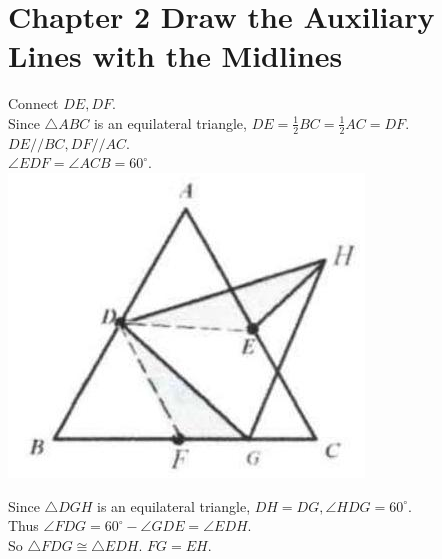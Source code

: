 \documentclass[10pt]{article}
\begin{document}
\section*{Chapter 2 Draw the Auxiliary Lines with the Midlines}
Connect \(D E, D F\).\\
Since \(\triangle A B C\) is an equilateral triangle, \(D E=\frac{1}{2} B C=\frac{1}{2} A C=D F\).\\
\(D E / / B C, D F / / A C\).\\
\(\angle E D F=\angle A C B=60^{\circ}\).\\
\includegraphics[max width=\textwidth, center]{2025_04_17_97bc1f7e44d93c271a88g-051(2)}

Since \(\triangle D G H\) is an equilateral triangle, \(D H=D G, \angle H D G=60^{\circ}\).\\
Thus \(\angle F D G=60^{\circ}-\angle G D E=\angle E D H\).\\
So \(\triangle F D G \cong \triangle E D H\). \(F G=E H\).
\end{document}
